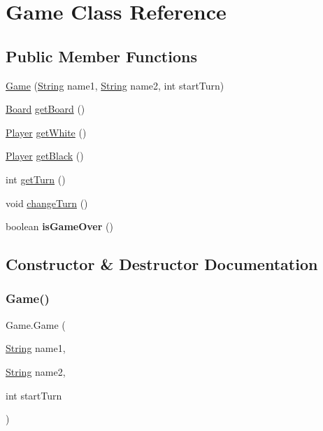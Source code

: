 \hypertarget{class_game}{}\section{Game Class Reference}
\label{class_game}
\subsection*{Public Member Functions}
\begin{DoxyCompactItemize}
\item 
\mbox{\hyperlink{class_game_adedc1b2ee6b957e72061ddd437dd424d}{Game}} (\mbox{\hyperlink{class_string}{String}} name1, \mbox{\hyperlink{class_string}{String}} name2, int start\+Turn)
\item 
\mbox{\hyperlink{class_board}{Board}} \mbox{\hyperlink{class_game_a2b39d812bd628cd73f804d9f3642d42f}{get\+Board}} ()
\item 
\mbox{\hyperlink{class_player}{Player}} \mbox{\hyperlink{class_game_a142d43f52974f44f3ef110a9a14c8db2}{get\+White}} ()
\item 
\mbox{\hyperlink{class_player}{Player}} \mbox{\hyperlink{class_game_a2161d1e6aca81f86dd2fdce22237f840}{get\+Black}} ()
\item 
int \mbox{\hyperlink{class_game_ae518e278826e5feba6f9fc5f3818ad02}{get\+Turn}} ()
\item 
void \mbox{\hyperlink{class_game_afbc203a292a81fe220603b6652a23a15}{change\+Turn}} ()
\item 
\mbox{\label{class_game_a8efa0b3d0c4abbcc2336fd82b01f3f14}} 
boolean {\bfseries is\+Game\+Over} ()
\end{DoxyCompactItemize}


\subsection{Constructor \& Destructor Documentation}
\mbox{\label{class_game_adedc1b2ee6b957e72061ddd437dd424d}} 
\subsubsection{\texorpdfstring{Game()}{Game()}}
{\footnotesize\ttfamily Game.\+Game (\begin{DoxyParamCaption}\item[{\mbox{\hyperlink{class_string}{String}}}]{name1,  }\item[{\mbox{\hyperlink{class_string}{String}}}]{name2,  }\item[{int}]{start\+Turn }\end{DoxyParamCaption})\hspace{0.3cm}{\ttfamily [inline]}}

